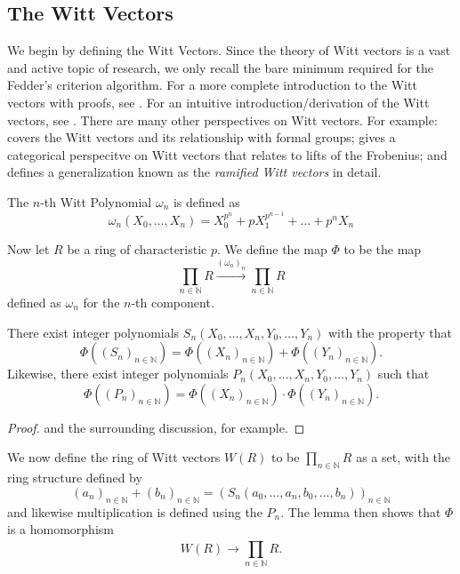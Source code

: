
\subsection{The Witt Vectors}

We begin by defining the Witt Vectors. 
Since the theory of Witt vectors is a vast and active topic of research,
we only recall the bare minimum 
required for the Fedder's criterion algorithm.
For a more complete introduction to the Witt vectors with proofs, 
see \cite{rabinoff-2014-witt-vec}.
For an intuitive introduction/derivation of the Witt vectors, see
\cite{kim-2017-witt-vec}.
There are many other perspectives on Witt vectors. 
For example:
\cite[Chapter~17]{hazewinkel-1978-formal-groups} covers the Witt vectors
and its relationship with formal groups; 
\cite{kedlaya-2021-prismatic} gives a categorical perspecitve on Witt vectors
that relates to lifts of the Frobenius; and
\cite[Chapter~1]{schneider-2017-galois-rep-phi-gamma} defines a generalization
known as the \textit{ramified Witt vectors} in detail.

\begin{defn}
	The \(n\)-th Witt Polynomial \(\omega_{n}\) is defined as
	\[
		\omega_{n}(X_{0}, \ldots, X_{n}) = X_{0}^{p^{n}} + pX_{1}^{p^{n-1}} + \ldots + p^{n}X_{n}
	\] 
\end{defn}

Now let \(R\) be a ring of characteristic \(p\).
We define the map \(\Phi\) to be the map 
\[
	\prod_{n \in \mathbb{N}}^{} R 
	\xrightarrow{(\omega_{n})_{n}} 
	\prod_{n \in \mathbb{N}}^{} R  
\] 
defined as \(\omega_{n}\) for the \(n\)-th component.

\begin{lem}
	There exist integer polynomials 
	\(S_n(X_{0}, \ldots, X_{n}, Y_{0}, \ldots, Y_{n})\) 
	with the property that 
	\[
		\Phi((S_{n})_{n \in \mathbb{N}}) =
		\Phi((X_{n})_{n \in \mathbb{N}}) 
		+ \Phi((Y_{n})_{n \in \mathbb{N}})
	.\] 
	Likewise, there exist integer polynomials 
	\(P_{n}(X_{0}, \ldots, X_{n}, Y_{0}, \ldots, Y_{n})\)
	such that
	\[
		\Phi((P_{n})_{n \in \mathbb{N}}) =
		\Phi((X_{n})_{n \in \mathbb{N}}) 
		\cdot \Phi((Y_{n})_{n \in \mathbb{N}})
	.\] 
\end{lem}

\begin{proof}
	\cite[Theorem~2.6]{rabinoff-2014-witt-vec} and the 
	surrounding discussion, for example.
\end{proof}

We now define the ring of Witt vectors 
\(W(R)\) to be 
\(\prod_{n \in \mathbb{N}}^{} R \) 
as a set, with the ring structure defined
by 
\[
	(a_{n})_{n \in \mathbb{N}} + 
	(b_{n})_{n \in \mathbb{N}} =
	(S_{n}(a_{0}, \ldots, a_{n}, b_{0}, \ldots, b_{n}))_{n \in \mathbb{N}}
\] 
and likewise multiplication is defined
using the \(P_{n}\).
The lemma then shows that \(\Phi\) is a homomorphism 
\[
	W(R) \xrightarrow{} \prod_{n \in \mathbb{N}}^{} R 
.\] 

